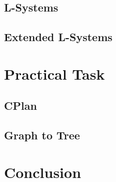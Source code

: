 \documentclass[11pt, a4paper]{report}
\begin{document}
\section{L-Systems}

\section{Extended L-Systems}


\chapter{Practical Task}

\section{CPlan}

\section{Graph to Tree}


\chapter{Conclusion}


\appendix
\glsaddall
\printglossaries
\end{document}
